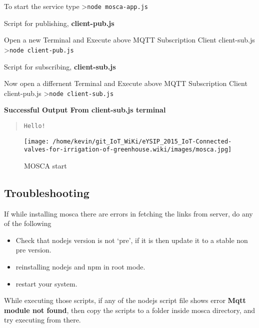 \documentclass[16pt]{article}
\begin{document}
To start the service type \textgreater{}\texttt{node mosca-app.js}

\vspace{0.5cm}
Script for publishing, \textbf{client-pub.js}

Open a new Terminal and Execute above MQTT Subscription Client
client-sub.js \textgreater{}\texttt{node client-pub.js}

\vspace{0.5cm}
Script for subscribing, \textbf{client-sub.js}

Now open a differnent Terminal and Execute above MQTT Subscription
Client client-pub.js \textgreater{}\texttt{node client-sub.js}

\vspace{0.5cm}
\textbf{Successful Output From client-sub.js terminal}

\begin{quote}
\texttt{Hello!}
\end{quote}


\begin{figure}
\hspace{2cm}
\texttt{[image: /home/kevin/git\_IoT\_WiKi/eYSIP\_2015\_IoT-Connected-valves-for-irrigation-of-greenhouse.wiki/images/mosca.jpg]}
\caption{MOSCA start}
\end{figure}

\vspace{0.5cm}

\subsection{Troubleshooting}


If while installing mosca there are errors in fetching the links from
server, do any of the following 

\begin{itemize}

\item Check that nodejs version is not
`pre', if it is then update it to a stable non pre version.
\item reinstalling nodejs and npm in root mode. 
\item restart your system.

\end{itemize}

While executing those scripts, if any of the nodejs script file shows
error \textbf{Mqtt module not found}, then copy the scripts to a folder
inside mosca directory, and try executing from there.
\end{document}
